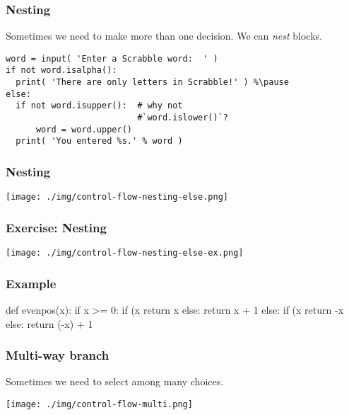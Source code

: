 \documentclass[11pt]{beamer}
\begin{document}
\begin{frame}[fragile]
  \frametitle{Nesting}
  \Enlarge

  \begin{itemize}
  \myitem  Sometimes we need to make more than one decision. %
  \myitem  We can \emph{nest} blocks. %
    \begin{Verbatim}
word = input( 'Enter a Scrabble word:  ' )
if not word.isalpha():
  print( 'There are only letters in Scrabble!' ) %\pause
else:
  if not word.isupper():  # why not
                          #`word.islower()`?
      word = word.upper()
  print( 'You entered %s.' % word )
    \end{Verbatim}
  \end{itemize}
\end{frame}

\begin{frame}
  \frametitle{Nesting}
  \texttt{[image: ./img/control-flow-nesting-else.png]}
\end{frame}

\begin{frame}
  \frametitle{Exercise:  Nesting}
  \texttt{[image: ./img/control-flow-nesting-else-ex.png]}
\end{frame}

\begin{frame}[fragile]
  \frametitle{Example}
  \Enlarge

  \begin{semiverbatim}
def evenpos(x):
    if x >= 0:
        if (x%
            return x
        else:
            return x + 1
    else:
        if (x%
            return -x
        else:
            return (-x) + 1
  \end{semiverbatim}
\end{frame}

\begin{frame}[fragile]
  \frametitle{Multi-way branch}
  \Enlarge

  \begin{itemize}
  \myitem  Sometimes we need to select among many choices.
  \end{itemize}
  \texttt{[image: ./img/control-flow-multi.png]}
\end{frame}
\end{document}
